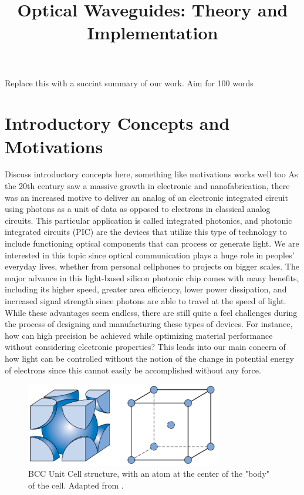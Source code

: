 \documentclass[10pt]{article}
\begin{document}
\noindent



\title{Optical Waveguides: Theory and Implementation}




\maketitle


\abstract
Replace this with a succint summary of our work. Aim for 100 words  

\section{Introductory Concepts and Motivations}

Discuss introductory concepts here, something like motivations works well too
As the 20th century saw a massive growth in electronic and nanofabrication, there was an increased motive to deliver an analog of an electronic integrated circuit using photons as a unit of data as opposed to electrons in classical analog circuits. This particular application is called integrated photonics, and photonic integrated circuits (PIC) are the devices that utilize this type of technology to include functioning optical components that can process or generate light. We are interested in this topic since optical communication plays a huge role in peoples’ everyday lives, whether from personal cellphones to projects on bigger scales. The major advance in this light-based silicon photonic chip comes with many benefits, including its higher speed, greater area efficiency, lower power dissipation, and increased signal strength since photons are able to travel at the speed of light. While these advantages seem endless, there are still quite a feel challenges during the process of designing and manufacturing these types of devices. For instance, how can high precision be achieved while optimizing material performance without considering electronic properties? This leads into our main concern of how light can be controlled without the notion of the change in potential energy of electrons since this cannot easily be accomplished without any force.


\begin{figure}[h]
    \centering
    \includegraphics[width=8.5cm]{fig1.eps}
    \caption{\label{tab1}BCC Unit Cell structure, with an atom at the center of the "body" of the cell. Adapted from \cite{ref01}.} 
    \end{figure}
\end{document}
